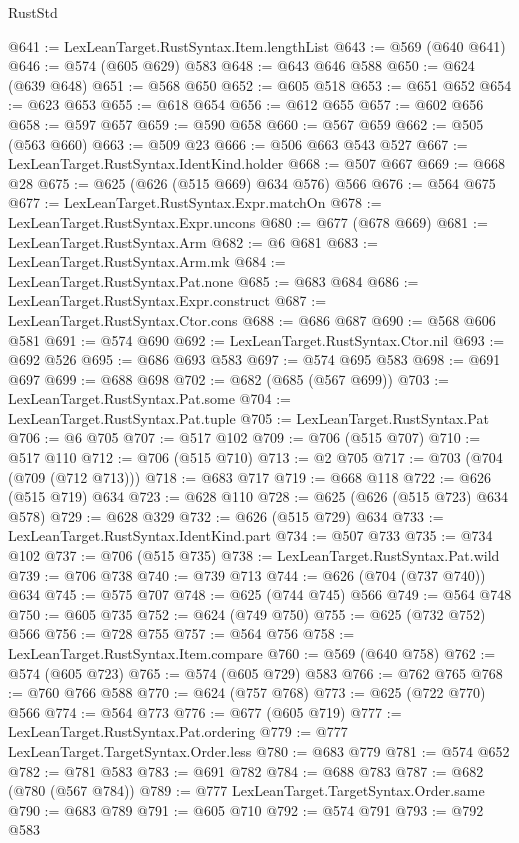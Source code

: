 \begin{lexlean}{RustStd}
\begin{coremodule}
@641 := LexLeanTarget.RustSyntax.Item.lengthList
@643 := @569 (@640 @641)
@646 := @574 (@605 @629) @583
@648 := @643 @646 @588
@650 := @624 (@639 @648)
@651 := @568 @650
@652 := @605 @518
@653 := @651 @652
@654 := @623 @653
@655 := @618 @654
@656 := @612 @655
@657 := @602 @656
@658 := @597 @657
@659 := @590 @658
@660 := @567 @659
@662 := @505 (@563 @660)
@663 := @509 @23
@666 := @506 @663 @543 @527
@667 := LexLeanTarget.RustSyntax.IdentKind.holder
@668 := @507 @667
@669 := @668 @28
@675 := @625 (@626 (@515 @669) @634 @576) @566
@676 := @564 @675
@677 := LexLeanTarget.RustSyntax.Expr.matchOn
@678 := LexLeanTarget.RustSyntax.Expr.uncons
@680 := @677 (@678 @669)
@681 := LexLeanTarget.RustSyntax.Arm
@682 := @6 @681
@683 := LexLeanTarget.RustSyntax.Arm.mk
@684 := LexLeanTarget.RustSyntax.Pat.none
@685 := @683 @684
@686 := LexLeanTarget.RustSyntax.Expr.construct
@687 := LexLeanTarget.RustSyntax.Ctor.cons
@688 := @686 @687
@690 := @568 @606 @581
@691 := @574 @690
@692 := LexLeanTarget.RustSyntax.Ctor.nil
@693 := @692 @526
@695 := @686 @693 @583
@697 := @574 @695 @583
@698 := @691 @697
@699 := @688 @698
@702 := @682 (@685 (@567 @699))
@703 := LexLeanTarget.RustSyntax.Pat.some
@704 := LexLeanTarget.RustSyntax.Pat.tuple
@705 := LexLeanTarget.RustSyntax.Pat
@706 := @6 @705
@707 := @517 @102
@709 := @706 (@515 @707)
@710 := @517 @110
@712 := @706 (@515 @710)
@713 := @2 @705
@717 := @703 (@704 (@709 (@712 @713)))
@718 := @683 @717
@719 := @668 @118
@722 := @626 (@515 @719) @634
@723 := @628 @110
@728 := @625 (@626 (@515 @723) @634 @578)
@729 := @628 @329
@732 := @626 (@515 @729) @634
@733 := LexLeanTarget.RustSyntax.IdentKind.part
@734 := @507 @733
@735 := @734 @102
@737 := @706 (@515 @735)
@738 := LexLeanTarget.RustSyntax.Pat.wild
@739 := @706 @738
@740 := @739 @713
@744 := @626 (@704 (@737 @740)) @634
@745 := @575 @707
@748 := @625 (@744 @745) @566
@749 := @564 @748
@750 := @605 @735
@752 := @624 (@749 @750)
@755 := @625 (@732 @752) @566
@756 := @728 @755
@757 := @564 @756
@758 := LexLeanTarget.RustSyntax.Item.compare
@760 := @569 (@640 @758)
@762 := @574 (@605 @723)
@765 := @574 (@605 @729) @583
@766 := @762 @765
@768 := @760 @766 @588
@770 := @624 (@757 @768)
@773 := @625 (@722 @770) @566
@774 := @564 @773
@776 := @677 (@605 @719)
@777 := LexLeanTarget.RustSyntax.Pat.ordering
@779 := @777 LexLeanTarget.TargetSyntax.Order.less
@780 := @683 @779
@781 := @574 @652
@782 := @781 @583
@783 := @691 @782
@784 := @688 @783
@787 := @682 (@780 (@567 @784))
@789 := @777 LexLeanTarget.TargetSyntax.Order.same
@790 := @683 @789
@791 := @605 @710
@792 := @574 @791
@793 := @792 @583

\end{coremodule}
\end{lexlean}
